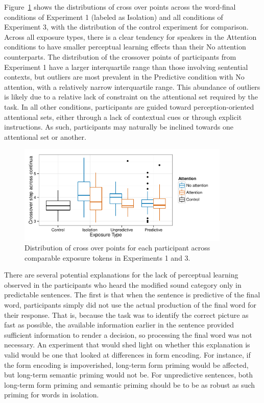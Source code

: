 Figure~\ref{fig:exp13xoverdist} shows the distributions of cross over points across the word-final conditions of Experiment 1 (labeled as Isolation) and all conditions of Experiment 3, with the distribution of the control experiment for comparison.  
Across all exposure types, there is a clear tendency for speakers in the Attention conditions to have smaller perceptual learning effects than their No attention counterparts.  
The distribution of the crossover points of participants from Experiment 1 have a larger interquartile range than those involving sentential contexts, but outliers are most prevalent in the Predictive condition with No attention, with a relatively narrow interquartile range.  
This abundance of outliers is likely due to a relative lack of constraint on the attentional set required by the task.  In all other conditions, participants are guided toward perception-oriented attentional sets, either through a lack of contextual cues or through explicit instructions.
As such, participants may naturally be inclined towards one attentional set or another.

\begin{figure}[!ht]
\centering
\caption{Distribution of cross over points for each participant across comparable exposure tokens in Experiments 1 and 3.}
\label{fig:exp13xoverdist}
\begin{center}
\includegraphics[width=0.9\textwidth]{graphs/exp13_xoverdist}
\end{center}
\end{figure}

There are several potential explanations for the lack of perceptual learning observed in the participants who heard the modified sound category only in predictable sentences.
The first is that when the sentence is predictive of the final word, participants simply did not use the actual production of the final word for their response.  
That is, because the task was to identify the correct picture as fast as possible, the available information earlier in the sentence provided sufficient information to render a decision, so processing the final word was not necessary.  
An experiment that would shed light on whether this explanation is valid would be one that looked at differences in form encoding.  
For instance, if the form encoding is impoverished, long-term form priming would be affected, but long-term semantic priming would not be.  
For unpredictive sentences, both long-term form priming and semantic priming should be to be as robust as such priming for words in isolation.

